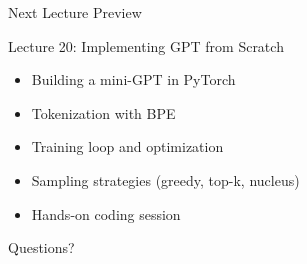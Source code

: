 \documentclass[aspectratio=169]{beamer}
\begin{document}
\begin{frame}{Next Lecture Preview 🔮}
\small
    \begin{block}{Lecture 20: Implementing GPT from Scratch}
        \begin{itemize}\setlength{\itemsep}{0pt}
            \item Building a mini-GPT in PyTorch
            \item Tokenization with BPE
            \item Training loop and optimization
            \item Sampling strategies (greedy, top-k, nucleus)
            \item Hands-on coding session
        \end{itemize}
    \end{block}

    \vspace{0.5cm}

    \begin{center}
        \Large{Questions? 💬}
    \end{center}
\end{frame}
\end{document}
